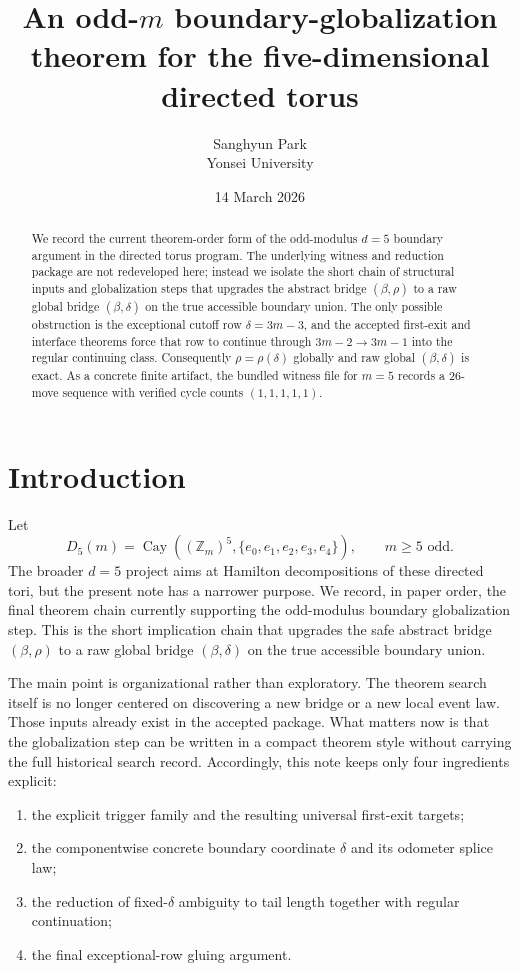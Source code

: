 \documentclass[11pt]{article}
\title{An odd-$m$ boundary-globalization theorem for the five-dimensional directed torus}
\author{Sanghyun Park \\ Yonsei University}
\date{14 March 2026}
\begin{document}
\maketitle

\begin{abstract}
We record the current theorem-order form of the odd-modulus $d=5$ boundary argument in the directed torus program.
The underlying witness and reduction package are not redeveloped here; instead we isolate the short chain of structural inputs and globalization steps that upgrades the abstract bridge $(\beta,\rho)$ to a raw global bridge $(\beta,\delta)$ on the true accessible boundary union.
The only possible obstruction is the exceptional cutoff row $\delta=3m-3$, and the accepted first-exit and interface theorems force that row to continue through $3m-2\to 3m-1$ into the regular continuing class.
Consequently $\rho=\rho(\delta)$ globally and raw global $(\beta,\delta)$ is exact.
As a concrete finite artifact, the bundled witness file for $m=5$ records a 26-move sequence with verified cycle counts $(1,1,1,1,1)$.
\end{abstract}

\section{Introduction}

Let
\[
D_5(m)=\operatorname{Cay}((\mathbb Z_m)^5,\{e_0,e_1,e_2,e_3,e_4\}),
\qquad m\ge 5\text{ odd}.
\]
The broader $d=5$ project aims at Hamilton decompositions of these directed tori, but the present note has a narrower purpose.
We record, in paper order, the final theorem chain currently supporting the odd-modulus boundary globalization step.
This is the short implication chain that upgrades the safe abstract bridge $(\beta,\rho)$ to a raw global bridge $(\beta,\delta)$ on the true accessible boundary union.

The main point is organizational rather than exploratory.
The theorem search itself is no longer centered on discovering a new bridge or a new local event law.
Those inputs already exist in the accepted package.
What matters now is that the globalization step can be written in a compact theorem style without carrying the full historical search record.
Accordingly, this note keeps only four ingredients explicit:
\begin{enumerate}[label=\textup{(\roman*)},leftmargin=2.5em]
\item the explicit trigger family and the resulting universal first-exit targets;
\item the componentwise concrete boundary coordinate $\delta$ and its odometer splice law;
\item the reduction of fixed-$\delta$ ambiguity to tail length together with regular continuation;
\item the final exceptional-row gluing argument.
\end{enumerate}
\end{document}
